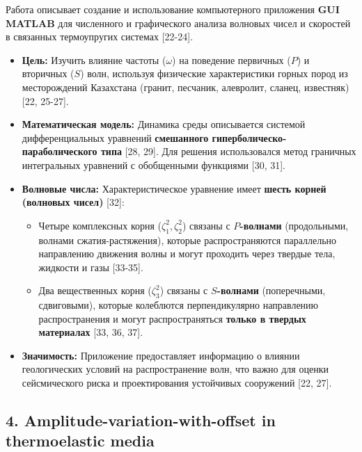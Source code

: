 \documentclass{article}
\begin{document}
Работа описывает создание и использование компьютерного приложения \textbf{GUI MATLAB} для численного и графического анализа волновых чисел и скоростей в связанных термоупругих системах [22-24].
\begin{itemize}
    \item \textbf{Цель:} Изучить влияние частоты ($\omega$) на поведение первичных ($P$) и вторичных ($S$) волн, используя физические характеристики горных пород из месторождений Казахстана (гранит, песчаник, алевролит, сланец, известняк) [22, 25-27].
    \item \textbf{Математическая модель:} Динамика среды описывается системой дифференциальных уравнений \textbf{смешанного гиперболическо-параболического типа} [28, 29]. Для решения использовался метод граничных интегральных уравнений с обобщенными функциями [30, 31].
    \item \textbf{Волновые числа:} Характеристическое уравнение имеет \textbf{шесть корней (волновых чисел)} [32]:
    \begin{itemize}
        \item Четыре комплексных корня ($\zeta_1^2, \zeta_2^2$) связаны с \textbf{$P$-волнами} (продольными, волнами сжатия-растяжения), которые распространяются параллельно направлению движения волны и могут проходить через твердые тела, жидкости и газы [33-35].
        \item Два вещественных корня ($\zeta_3^2$) связаны с \textbf{$S$-волнами} (поперечными, сдвиговыми), которые колеблются перпендикулярно направлению распространения и могут распространяться \textbf{только в твердых материалах} [33, 36, 37].
    \end{itemize}
    \item \textbf{Значимость:} Приложение предоставляет информацию о влиянии геологических условий на распространение волн, что важно для оценки сейсмического риска и проектирования устойчивых сооружений [22, 27].
\end{itemize}

\subsection*{4. Amplitude-variation-with-offset in thermoelastic media}
\end{document}
